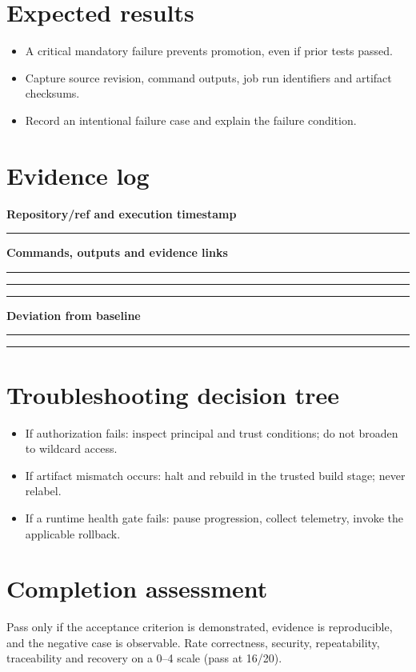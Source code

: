 \documentclass[10pt,letterpaper]{article}
\begin{document}
\section{Expected results}
\begin{itemize}
\item A critical mandatory failure prevents promotion, even if prior tests passed.
\item Capture source revision, command outputs, job run identifiers and artifact checksums.
\item Record an intentional failure case and explain the failure condition.
\end{itemize}

\section{Evidence log}
\textbf{Repository/ref and execution timestamp}\par
\noindent\rule{\linewidth}{0.35pt}\par\vspace{0.7em}
\textbf{Commands, outputs and evidence links}\par
\noindent\rule{\linewidth}{0.35pt}\par\vspace{0.7em}
\noindent\rule{\linewidth}{0.35pt}\par\vspace{0.7em}
\noindent\rule{\linewidth}{0.35pt}\par\vspace{0.7em}
\textbf{Deviation from baseline}\par
\noindent\rule{\linewidth}{0.35pt}\par\vspace{0.7em}
\noindent\rule{\linewidth}{0.35pt}\par\vspace{0.7em}

\section{Troubleshooting decision tree}
\begin{itemize}
\item If authorization fails: inspect principal and trust conditions; do not broaden to wildcard access.
\item If artifact mismatch occurs: halt and rebuild in the trusted build stage; never relabel.
\item If a runtime health gate fails: pause progression, collect telemetry, invoke the applicable rollback.
\end{itemize}

\section{Completion assessment}
Pass only if the acceptance criterion is demonstrated, evidence is reproducible, and the negative case is observable. Rate correctness, security, repeatability, traceability and recovery on a 0--4 scale (pass at 16/20).
\end{document}
